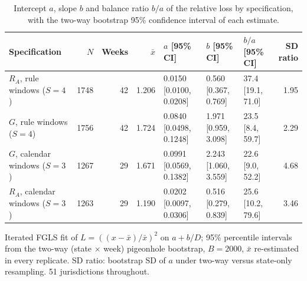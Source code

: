 \begin{table}[htbp]
\centering
\footnotesize
\caption{Intercept $a$, slope $b$ and balance ratio $b/a$ of the relative loss by specification, with the two-way bootstrap 95\% confidence interval of each estimate.}
\label{tab:s1}
\begin{tabular}{lrrrlllr}
\toprule
Specification & $N$ & Weeks & $\bar{x}$ & $a$ [95\% CI] & $b$ [95\% CI] & $b/a$ [95\% CI] & SD ratio \\
\midrule
$R_A$, rule windows ($S=4$) & 1748 & 42 & 1.206 & 0.0150 [0.0100, 0.0208] & 0.560 [0.367, 0.769] & 37.4 [19.1, 71.0] & 1.95 \\
$G$, rule windows ($S=4$) & 1756 & 42 & 1.724 & 0.0840 [0.0498, 0.1248] & 1.971 [0.959, 3.098] & 23.5 [8.4, 59.7] & 2.29 \\
$G$, calendar windows ($S=3$) & 1267 & 29 & 1.671 & 0.0991 [0.0569, 0.1382] & 2.243 [1.060, 3.559] & 22.6 [9.0, 52.2] & 4.68 \\
$R_A$, calendar windows ($S=3$) & 1263 & 29 & 1.190 & 0.0202 [0.0097, 0.0306] & 0.516 [0.279, 0.839] & 25.6 [10.2, 79.6] & 3.46 \\
\bottomrule
\end{tabular}
\par\smallskip
\begin{minipage}{0.95\linewidth}\scriptsize Iterated FGLS fit of $L=((x-\bar{x})/\bar{x})^2$ on $a+b/D$; 95\% percentile intervals from the two-way (state $\times$ week) pigeonhole bootstrap, $B=2000$, $\bar{x}$ re-estimated in every replicate. SD ratio: bootstrap SD of $a$ under two-way versus state-only resampling. 51 jurisdictions throughout.\end{minipage}
\end{table}
